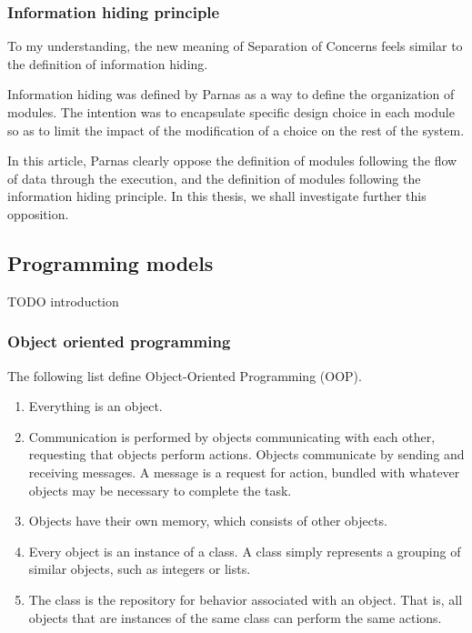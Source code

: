 \subsubsection{Information hiding principle}

To my understanding, the new meaning of Separation of Concerns feels similar to the definition of information hiding.

Information hiding was defined by Parnas \cite{Parnas1972} as a way to define the organization of modules.
The intention was to encapsulate specific design choice in each module so as to limit the impact of the modification of a choice on the rest of the system.

In this article, Parnas clearly oppose the definition of modules following the flow of data through the execution, and the definition of modules following the information hiding principle.
In this thesis, we shall investigate further this opposition.



\subsection{Programming models}

TODO introduction

\subsubsection{Object oriented programming}

The following list define Object-Oriented Programming (OOP).

\begin{enumerate}
\item Everything is an object.
\item Communication is performed by objects communicating with each other, requesting that objects perform actions. Objects communicate by sending and receiving messages. A message is a request for action, bundled with whatever objects may be necessary to complete the task.
\item Objects have their own memory, which consists of other objects.
\item Every object is an instance of a class. A class simply represents a grouping of similar objects, such as integers or lists.
\item The class is the repository for behavior associated with an object. That is, all objects that are instances of the same class can perform the same actions.
\end{enumerate}

